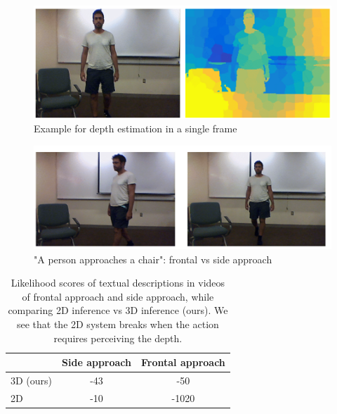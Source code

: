 \documentclass[10pt,twocolumn,letterpaper]{article}
\begin{document}
\begin{figure}[ht]
\begin{center}
   \includegraphics[width=0.8\linewidth]{depth_estim_example.png}
   \end{center}
   \caption{Example for depth estimation in a single frame}
\label{fig_depth_frame}
\end{figure}

\begin{figure}[ht]
\begin{center}
   \includegraphics[width=0.8\linewidth]{front_vs_side_approach.png}
   \end{center}
   \caption{"A person approaches a chair": frontal vs side approach}
\label{fig_front_vs_side}
\end{figure}

\begin{table}
\begin{center}
\begin{tabular}{|l|c|c|}
\hline 
  & Side approach & Frontal approach  \\
\hline\hline
3D (ours) & -43 & -50\\
2D \cite{siddharth2014seeing} & -10 & -1020 \\
\hline
\end{tabular}
\end{center}
\caption{Likelihood scores of textual descriptions in videos of frontal approach and side approach, while comparing 2D inference \cite{siddharth2014seeing} vs 3D inference (ours). We see that the 2D system breaks when the action requires perceiving the depth.}
\label{table_likelihood}
\end{table}

{\small


}
\end{document}
